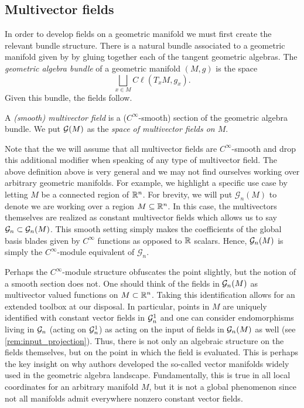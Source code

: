 \subsection{Multivector fields}

In order to develop fields on a geometric manifold we must first create the relevant bundle structure. There is a natural bundle associated to a  geometric manifold given by by gluing together each of the tangent geometric algebras. The \emph{geometric algebra bundle} of a geometric manifold $(M,g)$ is the space
\begin{equation}
\bigsqcup_{x \in M} C\ell(T_xM,g_x).
\end{equation}
Given this bundle, the fields follow.
\begin{definition}
A \emph{(smooth) multivector field} is a ($C^{\infty}$-smooth) section of the geometric algebra bundle. We put $\mathcal{G}(M)$ as the \emph{space of multivector fields on $M$}.
\end{definition}
Note that the we will assume that all multivector fields are $C^\infty$-smooth and drop this additional modifier when speaking of any type of multivector field. The above definition above is very general and we may not find ourselves working over arbitrary geometric manifolds. For example, we highlight a specific use case by letting $M$ be a connected region of $\mathbb{R}^n$. For brevity, we will put $\mathcal{G}_n(M)$ to denote we are working over a region $M\subseteq \mathbb{R}^n$. In this case, the multivectors themselves are realized as constant multivector fields which allows us to say $\mathcal{G}_n \subset \mathcal{G}_n(M)$. This smooth setting simply makes the coefficients of the global basis blades given by $C^\infty$ functions as opposed to $\mathbb{R}$ scalars.  Hence, $\mathcal{G}_n(M)$ is simply the $C^{\infty}$-module equivalent of $\mathcal{G}_n$.

Perhaps the $C^\infty$-module structure obfuscates the point slightly, but the notion of a smooth section does not.  One should think of the fields in $\mathcal{G}_n(M)$ as multivector valued functions on $M \subset \mathbb{R}^n$. Taking this identification allows for an extended toolbox at our disposal. In particular, points in $M$ are uniquely identified with constant vector fields in $\mathcal{G}_n^1$ and one can consider endomorphisms living in $\mathcal{G}_n$ (acting on $\mathcal{G}_n^1$) as acting on the input of fields in $\mathcal{G}_n(M)$ as well (see \cref{rem:input_projection}).  Thus, there is not only an algebraic structure on the fields themselves, but on the point in which the field is evaluated.  This is perhaps the key insight on why authors developed the so-called vector manifolds widely used in the geometric algebra landscape. Fundamentally, this is true in all local coordinates for an arbitrary manifold $M$, but it is not a global phenomenon since not all manifolds admit everywhere nonzero constant vector fields. 

